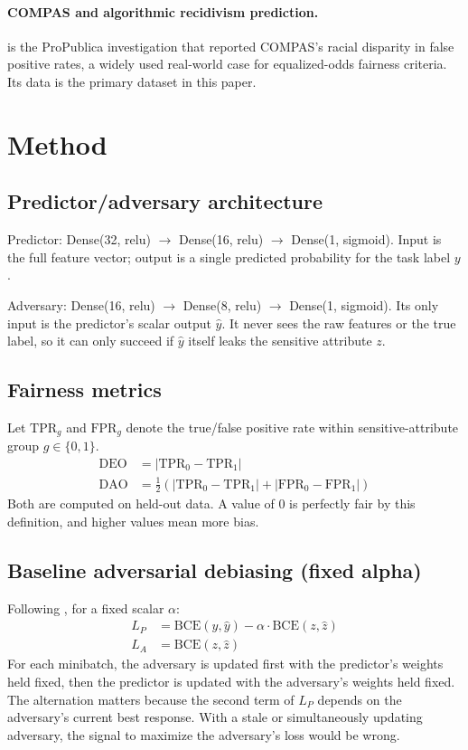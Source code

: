 \documentclass[11pt]{article}
\begin{document}
\paragraph{COMPAS and algorithmic recidivism prediction.}
\citet{angwin2016machine} is the ProPublica investigation that reported
COMPAS's racial disparity in false positive rates, a widely used
real-world case for equalized-odds fairness criteria. Its data is the
primary dataset in this paper.

\section{Method}

\subsection{Predictor/adversary architecture}
Predictor: Dense(32, relu) $\to$ Dense(16, relu) $\to$ Dense(1, sigmoid).
Input is the full feature vector; output is a single predicted
probability for the task label $y$.

Adversary: Dense(16, relu) $\to$ Dense(8, relu) $\to$ Dense(1, sigmoid).
Its only input is the predictor's scalar output $\hat{y}$. It never sees
the raw features or the true label, so it can only succeed if $\hat{y}$
itself leaks the sensitive attribute $z$.

\subsection{Fairness metrics}
Let $\text{TPR}_g$ and $\text{FPR}_g$ denote the true/false positive rate
within sensitive-attribute group $g \in \{0, 1\}$.
\begin{align}
  \text{DEO} &= |\text{TPR}_0 - \text{TPR}_1| \\
  \text{DAO} &= \tfrac{1}{2}\left(|\text{TPR}_0 - \text{TPR}_1| + |\text{FPR}_0 - \text{FPR}_1|\right)
\end{align}
Both are computed on held-out data. A value of 0 is perfectly fair by
this definition, and higher values mean more bias.

\subsection{Baseline adversarial debiasing (fixed alpha)}
Following \citet{zhang2018mitigating}, for a fixed scalar $\alpha$:
\begin{align}
  L_P &= \text{BCE}(y, \hat{y}) - \alpha \cdot \text{BCE}(z, \hat{z}) \\
  L_A &= \text{BCE}(z, \hat{z})
\end{align}
For each minibatch, the adversary is updated first with the predictor's
weights held fixed, then the predictor is updated with the adversary's
weights held fixed. The alternation matters because the second term of
$L_P$ depends on the adversary's current best response. With a stale or
simultaneously updating adversary, the signal to maximize the
adversary's loss would be wrong.
\end{document}
